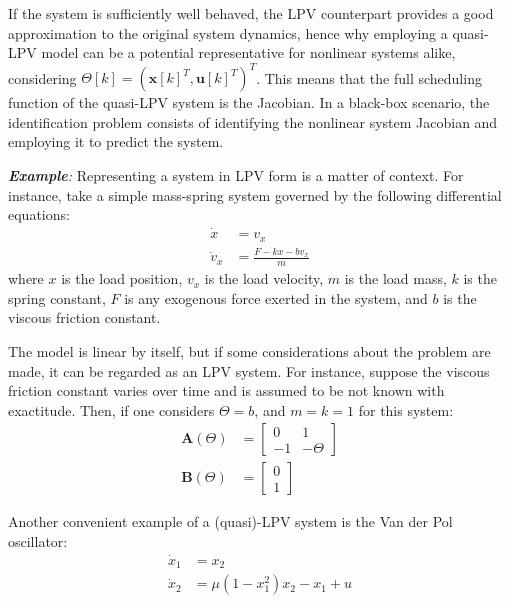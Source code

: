 If the system is sufficiently well behaved, the LPV counterpart provides a good approximation to the original system dynamics, hence why employing a quasi-LPV model can be a potential representative for nonlinear systems alike, considering $\Theta [k] = (\mathbf{x}[k]^T,\mathbf{u}[k]^T)^T$.
%
This means that the full scheduling function of the quasi-LPV system is the Jacobian.
%
In a black-box scenario, the identification problem consists of identifying the nonlinear system Jacobian and employing it to predict the system.

\mbox{}

\noindent\textit{\textbf{Example}:} Representing a system in LPV form is a matter of context.
%
For instance, take a simple mass-spring system governed by the following differential equations:
\begin{equation}
\begin{aligned}
    \dot{x} &= v_x\\
    \dot{v}_x &= \frac{F - kx - bv_x}{m}
\end{aligned}
\end{equation}
where $x$ is the load position, $v_x$ is the load velocity, $m$ is the load mass, $k$ is the spring constant, $F$ is any exogenous force exerted in the system, and $b$ is the viscous friction constant.

The model is linear by itself, but if some considerations about the problem are made, it can be regarded as an LPV system.
%
For instance, suppose the viscous friction constant varies over time and is assumed to be not known with exactitude.
%
Then, if one considers $\Theta = b$, and $m = k = 1$ for this system:
\begin{equation}
\begin{aligned}
    \mathbf{A}(\Theta) &= 
    \begin{bmatrix}
      0 & 1\\
      -1 & -\Theta
    \end{bmatrix}\\
    \mathbf{B}(\Theta) &=
    \begin{bmatrix}
        0\\
        1
    \end{bmatrix}
\end{aligned}
\end{equation}

Another convenient example of a (quasi)-LPV system is the Van der Pol oscillator:
\begin{equation}
\begin{aligned} \label{eq:sys:VandePol}
  \dot{x}_1 &= x_2\\
  \dot{x}_2 &= \mu(1-x_1^2)x_2 - x_1 + u
\end{aligned}
\end{equation}

